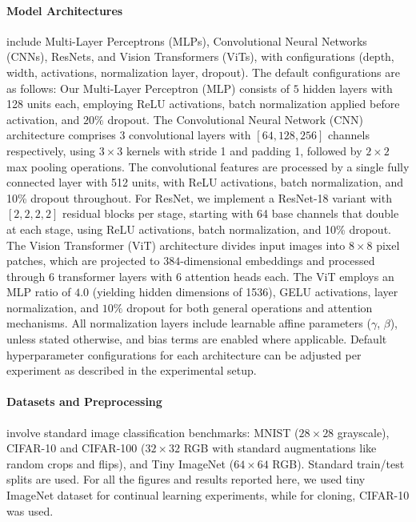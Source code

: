 \documentclass{article}
\numberwithin{figure}{section}
\begin{document}
\paragraph{Model Architectures} include Multi-Layer Perceptrons (MLPs), Convolutional Neural Networks (CNNs), ResNets, and Vision Transformers (ViTs), with configurations (depth, width, activations, normalization layer, dropout). The default configurations are as follows:
Our Multi-Layer Perceptron (MLP) consists of $5$ hidden layers with 128 units each, employing ReLU activations, batch normalization applied before activation, and $20\%$ dropout. The Convolutional Neural Network (CNN) architecture comprises 3 convolutional layers with $[64, 128, 256]$ channels respectively, using $3\times3$ kernels with stride 1 and padding 1, followed by $2\times2$ max pooling operations. The convolutional features are processed by a single fully connected layer with 512 units, with ReLU activations, batch normalization, and 10\% dropout throughout. For ResNet, we implement a ResNet-18 variant with $[2, 2, 2, 2]$ residual blocks per stage, starting with 64 base channels that double at each stage, using ReLU activations, batch normalization, and 10\% dropout. The Vision Transformer (ViT) architecture divides input images into $8\times8$ pixel patches, which are projected to $384$-dimensional embeddings and processed through $6$ transformer layers with $6$ attention heads each. The ViT employs an MLP ratio of $4.0$ (yielding hidden dimensions of 1536), GELU activations, layer normalization, and $10\%$ dropout for both general operations and attention mechanisms. All normalization layers include learnable affine parameters ($\gamma$, $\beta$), unless stated otherwise, and bias terms are enabled where applicable. Default hyperparameter configurations for each architecture can be adjusted per experiment as described in the experimental setup.

\paragraph{Datasets and Preprocessing} involve standard image classification benchmarks: MNIST ($28 \times 28$ grayscale), CIFAR-10 and CIFAR-100 ($32 \times 32$ RGB with standard augmentations like random crops and flips), and Tiny ImageNet ($64 \times 64$ RGB). Standard train/test splits are used. For all the figures and results reported here, we used tiny ImageNet dataset for continual learning experiments, while for cloning, CIFAR-10 was used.  
\end{document}
